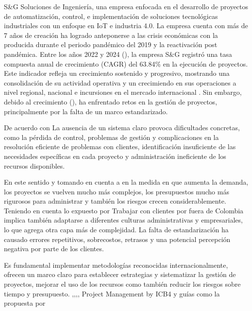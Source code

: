 S\&G Soluciones de Ingeniería, una empresa enfocada en el desarrollo de proyectos de automatización, control, e implementación de soluciones tecnológicas industriales con un enfoque en IoT e industria 4.0. La empresa cuenta con más de 7 años de creación ha logrado anteponerse a las crisis económicas con la producida durante el periodo pandémico del 2019 y la reactivación post pandémica. Entre los años 2022 y 2024 (), la empresa S\&G registró una tasa compuesta anual de crecimiento (CAGR) del 63.84\% en la ejecución de proyectos. Este indicador refleja un crecimiento sostenido y progresivo, mostrando una consolidación de su actividad operativa y un crecimiendo en sus operaciones a nivel regional, nacional e incursiones en el mercado internacional . Sin embargo, debido al crecimiento (), ha enfrentado retos en la gestión de proyectos, principalmente por la falta de un marco estandarizado. 




 De acuerdo con \parencite{kerznerUsingProjectManagement2019} La ausencia de un sistema claro provoca dificultades concretas, como la pérdida de control, problemas de gestión y complicaciones en la resolución eficiente de problemas con clientes, identificación insuficiente de las necesidades específicas en cada proyecto y administración ineficiente de los recursos disponibles. 

En este sentido y tomando en cuenta a \parencite{wysockiProjectManagementProcess2004} en la medida en que aumenta la demanda, los proyectos se vuelven mucho más complejos, los presupuestos mucho más rigurosos para administrar y también los riesgos crecen considerablemente. Teniendo en cuenta lo expuesto por \parencite{juhreManagingInternationalCrosscultural2000} Trabajar con clientes por fuera de Colombia implica también adaptarse a diferentes culturas administrativas y empresariales, lo que agrega otra capa más de complejidad. La falta de estandarización ha causado errores repetitivos, sobrecostos, retrasos y una potencial percepción negativa por parte de los clientes. 

Es fundamental implementar metodologías reconocidas internacionalmente, ofrecen un marco claro para establecer estrategias y sistematizar la gestión de proyectos, mejorar el uso de los recursos como también reducir los riesgos sobre tiempo y presupuesto. \parencite{projectmanagementinstituteStandardProjectManagement2021},\parencite{projectmanagementinstituteGuideProjectManagement2017},\parencite{associationforprojectmanagementAPMBodyKnowledge2019},\parencite{isoISO2150020212021}, Project Management by ICB4 \parencite{hedemanProjectManagementICB42023} y guías como la propuesta por \parencite{kerznerProjectManagementSystems2006}

